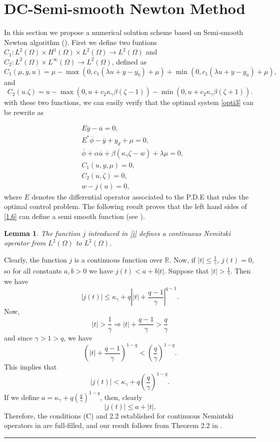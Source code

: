 \documentclass[11pt,a4paper]{amsart}
\newcommand{\kw}{\rule{2mm}{2mm}}
\renewcommand{\l}{\left}
\renewcommand{\r}{\right}
\newcommand{\om}{\Omega}
\newcommand{\reals}{\mathbb{R}}
\renewenvironment{proof}{{Proof.}}{\hfill\kw}
\newtheorem{lemma}{{Lemma}}
\newcommand{\subtag}[1]{\tag{\theparentequation#1}}
\begin{document}
\section{DC-Semi-smooth Newton Method}

In this section we propose a numerical solution scheme based on Semi-smooth Newton algorithm (\cite{merino1, ulbrich}). First we define two funtions $C_1:L^2(\om)\times H^{1}(\om)\times L^2(\om)\to L^2(\om)$ and $C_2:L^2(\om)\times L^{\infty}(\om)\to L^2(\om)$, defined as
\[
    C_{1}(\mu,y,u)=\mu-\max(0,c_1(\lambda u+y-y_b)+\mu)+\min(0,c_1(\lambda u+y-y_a)+\mu),
\]
and
\[
C_{2}(u.\zeta)=u-\max(0,u+c_2\kappa_{\gamma}\beta(\zeta-1))-\min(0,u+c_2\kappa_{\gamma}\beta(\zeta+1)).
\]
with these two functions, we can easily verify that the optimal system \eqref{opti3} can be rewrite as

\begin{subequations}\label{1.6}
\begin{align}
    &E\overline{y}-\overline{u}=0,\subtag{a}\\
    &E^*\overline{\phi}-\overline{y}+y_d+\mu=0,\subtag{b}\\
    &\overline{\phi}+\alpha \overline{u}+\beta (\kappa_{\gamma}\zeta-w)+\lambda \mu=0,\subtag{c}\\
    &C_1(u,y,\mu)=0,\subtag{d}\\
    &C_2(u,\zeta)=0,\subtag{e}\\
    &w-j(u)=0,\subtag{f}
\end{align}
\end{subequations}
where $E$ denotes the differential operator associated to the P.D.E that rules the optimal control problem. The following result proves that the left hand sides of \eqref{1.6} can define a semi smooth function (see \cite{ulbrich}).

\begin{lemma}
The function $j$ introduced in \eqref{j} defines a continuous Nemitski  operator from $L^2(\om)$ to $L^2(\om)$.
\end{lemma}

\begin{proof}
Clearly, the function $j$ is a continuous function over $\reals$. Now, if $|t|\le \frac{1}{\gamma}$, $j(t)=0$, so for all constants $a,b>0$ we have $j(t)<a+b|t|$. Suppose that $|t|>\frac{1}{\gamma}$. Then we have
\[
    |j(t)|\le \kappa_{\gamma} +q\l||t|+\frac{q-1}{\gamma}\r|^{q-1}.
\]
Now,
\[
|t|>\frac{1}{\gamma}\Rightarrow |t|+\frac{q-1}{\gamma}>\frac{q}{\gamma}
\]
and since $\gamma>1>q$, we have
\[
    \l(|t|+\frac{q-1}{\gamma}\r)^{1-q}<\l(\frac{q}{\gamma}\r)^{1-q}.
\]
This implies that
\[
|j(t)|<\kappa_{\gamma}+q\l(\frac{q}{\gamma}\r)^{1-q}.
\]
If we define $a=\kappa_{\gamma}+q\l(\frac{q}{\gamma}\r)^{1-q}$, then, clearly
\[
|j(t)|\le a+|t|.
\]
Therefore, the conditions (C) and 2.2 established for continuous Nemintski operators in \cite{ambrosetti} are full-filled, and our result follows from Theorem 2.2 in \cite{ambrosetti}. 
\end{proof}
\end{document}
